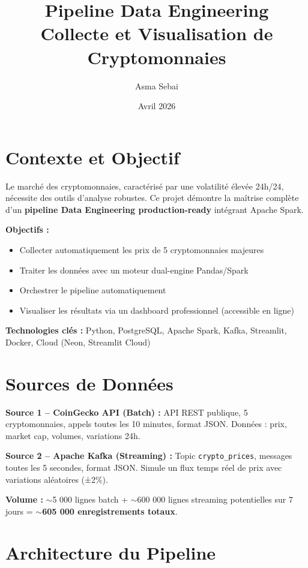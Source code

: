 \documentclass[11pt,a4paper]{article}
\title{\Large \textbf{Pipeline Data Engineering\\Collecte et Visualisation de Cryptomonnaies}}
\author{\large Asma Sebai}
\date{\large Avril 2026}
\begin{document}
\maketitle

{\small \tableofcontents}
\newpage

\section{Contexte et Objectif}

Le marché des cryptomonnaies, caractérisé par une volatilité élevée 24h/24, nécessite des outils d'analyse robustes. Ce projet démontre la maîtrise complète d'un \textbf{pipeline Data Engineering production-ready} intégrant Apache Spark.

\textbf{Objectifs :}
\begin{itemize}[noitemsep]
    \item Collecter automatiquement les prix de 5 cryptomonnaies majeures
    \item Traiter les données avec un moteur dual-engine Pandas/Spark
    \item Orchestrer le pipeline automatiquement
    \item Visualiser les résultats via un dashboard professionnel (accessible en ligne)
\end{itemize}

\textbf{Technologies clés :} Python, PostgreSQL, Apache Spark, Kafka, Streamlit, Docker, Cloud (Neon, Streamlit Cloud)

\section{Sources de Données}

\textbf{Source 1 -- CoinGecko API (Batch) :} API REST publique, 5 cryptomonnaies, appels toutes les 10 minutes, format JSON. Données : prix, market cap, volumes, variations 24h.

\textbf{Source 2 -- Apache Kafka (Streaming) :} Topic \texttt{crypto\_prices}, messages toutes les 5 secondes, format JSON. Simule un flux temps réel de prix avec variations aléatoires (±2\%).

\textbf{Volume :} $\sim$5 000 lignes batch + $\sim$600 000 lignes streaming potentielles sur 7 jours = \textbf{$\sim$605 000 enregistrements totaux}.

\section{Architecture du Pipeline}
\end{document}

